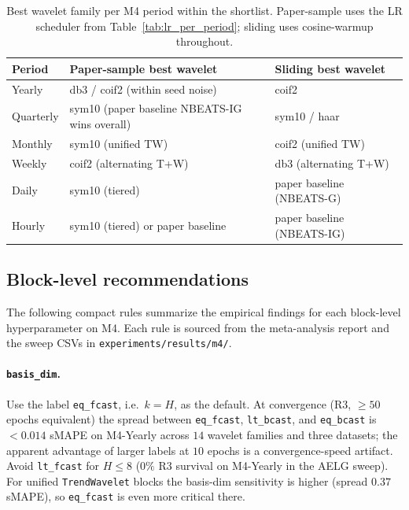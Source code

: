 \documentclass{article}
\begin{document}
\begin{table}[h]
\centering
\small
\caption{Best wavelet family per M4 period within the shortlist. Paper-sample uses the LR scheduler from Table~\ref{tab:lr_per_period}; sliding uses cosine-warmup throughout.}
\label{tab:wavelet_per_period}
\begin{tabular}{@{}lll@{}}
\toprule
Period & Paper-sample best wavelet & Sliding best wavelet \\
\midrule
Yearly    & db3 / coif2 (within seed noise)         & coif2 \\
Quarterly & sym10 (paper baseline NBEATS-IG wins overall) & sym10 / haar \\
Monthly   & sym10 (unified TW)                      & coif2 (unified TW) \\
Weekly    & coif2 (alternating T+W)                 & db3 (alternating T+W) \\
Daily     & sym10 (tiered)                          & paper baseline (NBEATS-G) \\
Hourly    & sym10 (tiered) or paper baseline        & paper baseline (NBEATS-IG) \\
\bottomrule
\end{tabular}
\end{table}

\subsection{Block-level recommendations}
\label{app:hyperparams:block}

The following compact rules summarize the empirical findings for each block-level hyperparameter on M4. Each rule is sourced from the meta-analysis report and the sweep CSVs in \texttt{experiments/results/m4/}.

\paragraph{\texttt{basis\_dim}.} Use the label \texttt{eq\_fcast}, i.e.\ $k = H$, as the default. At convergence (R3, $\geq 50$ epochs equivalent) the spread between \texttt{eq\_fcast}, \texttt{lt\_bcast}, and \texttt{eq\_bcast} is $<0.014$ sMAPE on M4-Yearly across $14$ wavelet families and three datasets; the apparent advantage of larger labels at $10$ epochs is a convergence-speed artifact. Avoid \texttt{lt\_fcast} for $H \le 8$ ($0\%$ R3 survival on M4-Yearly in the AELG sweep). For unified \texttt{TrendWavelet} blocks the basis-dim sensitivity is higher (spread $0.37$ sMAPE), so \texttt{eq\_fcast} is even more critical there.
\end{document}
